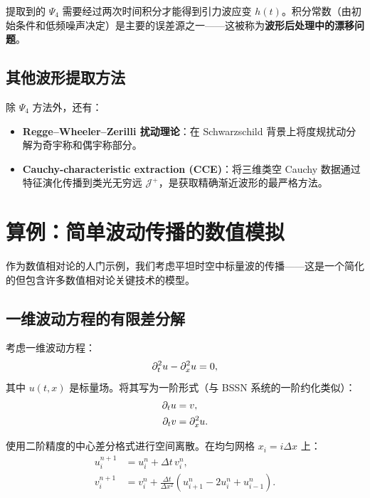 提取到的 $\Psi_4$ 需要经过两次时间积分才能得到引力波应变 $h(t)$。积分常数（由初始条件和低频噪声决定）是主要的误差源之一——这被称为\textbf{波形后处理中的漂移问题}。

\subsection{其他波形提取方法}

除 $\Psi_4$ 方法外，还有：
\begin{itemize}
    \item \textbf{Regge--Wheeler--Zerilli 扰动理论}：在 Schwarzschild 背景上将度规扰动分解为奇宇称和偶宇称部分。
    \item \textbf{Cauchy-characteristic extraction (CCE)}：将三维类空 Cauchy 数据通过特征演化传播到类光无穷远 $\mathcal{J}^+$，是获取精确渐近波形的最严格方法。
\end{itemize}

\section{算例：简单波动传播的数值模拟}
\label{sec:example}

作为数值相对论的人门示例，我们考虑平坦时空中标量波的传播——这是一个简化的但包含许多数值相对论关键技术的模型。

\subsection{一维波动方程的有限差分解}

考虑一维波动方程：
\begin{equation}
    \partial_t^2 u - \partial_x^2 u = 0,
    \label{eq:wave1d}
\end{equation}
其中 $u(t,x)$ 是标量场。将其写为一阶形式（与 BSSN 系统的一阶约化类似）：
\begin{align}
    \partial_t u &= v, \label{eq:wave1d_u} \\
    \partial_t v &= \partial_x^2 u. \label{eq:wave1d_v}
\end{align}

使用二阶精度的中心差分格式进行空间离散。在均匀网格 $x_i = i\Delta x$ 上：
\begin{align}
    u_i^{n+1} &= u_i^n + \Delta t \, v_i^n, \\
    v_i^{n+1} &= v_i^n + \frac{\Delta t}{\Delta x^2}(u_{i+1}^n - 2u_i^n + u_{i-1}^n).
\end{align}

